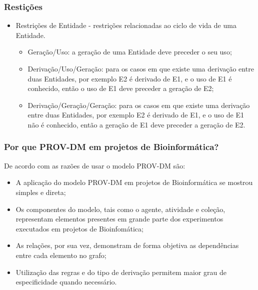 \documentclass{beamer}
\begin{document}
\begin{frame}
\frametitle{Resti\c{c}\~oes}

\begin{itemize}
\item Restri\c{c}\~oes de Entidade - restri\c{c}\~oes relacionadas ao
  ciclo de vida de uma Entidade.
\begin{itemize}
\item Gera\c{c}\~ao/Uso: a gera\c{c}\~ao de uma Entidade deve preceder
  o seu uso;
\item Deriva\c{c}\~ao/Uso/Gera\c{c}\~ao: para os casos em que existe
  uma deriva\c{c}\~ao entre duas Entidades, por exemplo E2 \'e
  derivado de E1, e o uso de E1 \'e conhecido, ent\~ao o uso de E1
  deve preceder a gera\c{c}\~ao de E2;
\item Deriva\c{c}\~ao/Gera\c{c}\~ao/Gera\c{c}\~ao: para os casos em
  que existe uma deriva\c{c}\~ao entre duas Entidades, por exemplo E2
  \'e derivado de E1, e o uso de E1 n\~ao \'e conhecido, ent\~ao a
  gera\c{c}\~ao de E1 deve preceder a gera\c{c}\~ao de E2.
\end{itemize}
\end{itemize}
\end{frame}

\begin{frame}
\frametitle{Por que PROV-DM em projetos de Bioinform\'atica?}
De acordo com \cite{p10} as raz\~oes de usar o modelo PROV-DM s\~ao:
\begin{itemize}
\item A aplica\c{c}\~ao do modelo PROV-DM em projetos de
  Bioinform\'atica se mostrou simples e direta;
\item Os componentes do modelo, tais como o agente, atividade e
  cole\c{c}\~ao, representam elementos presentes em grande parte dos
  experimentos executados em projetos de Bioinfom\'atica;
\item As rela\c{c}\~oes, por sua vez, demonstram de forma objetiva as
  depend\^encias entre cada elemento no grafo;
\item Utiliza\c{c}\~ao das regras e do tipo de deriva\c{c}\~ao permitem maior grau de especificidade quando necess\'ario.
\end{itemize}
\end{frame}

\end{document}
